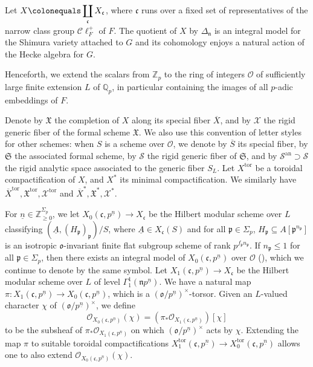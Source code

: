 \documentclass[11pt]{amsart}
\theoremstyle{definition} %
\theoremstyle{plain} %
\theoremstyle{remark} %
\newcommand{\QQ}{{\mathbb Q}}
\newcommand{\ZZ}{{\mathbb Z}}
\newcommand{\cO}{{\mathcal O}}
\newcommand{\cS}{{\mathcal S}}
\newcommand{\cX}{{\mathcal X}}
\newcommand{\frakS}{\mathfrak S}
\newcommand{\frakX}{\mathfrak X}
\newcommand{\frakc}{\mathfrak c}
\newcommand{\frakn}{\mathfrak n}
\newcommand{\frako}{\mathfrak o}
\newcommand{\frakp}{\mathfrak p}
\newcommand{\defeq}{\colonequals} %
\newcommand{\tor}{\mathrm{tor}} %
\newcommand{\an}{\mathrm{an}}
\newcommand{\Cl}{\mathscr{C}\!\ell_F^+}
\begin{document}
Let $\displaystyle   X\defeq\coprod_{\frakc} X_{\frakc}$,
where $\frakc$ runs over a fixed set of representatives of the narrow class group $\Cl$ of $F$. The quotient of $X$ by $\Delta_\frakn$ is an integral model for the Shimura variety attached to $G$ and its cohomology enjoys a natural action of the  Hecke algebra for $G$. 

Henceforth,  we extend the scalars from $\ZZ_p$ to the ring of integers $\cO$ of sufficiently large finite extension $L$ of $\QQ_p$, in particular containing the images of all $p$-adic embeddings of $F$. 

Denote by  $\frakX$  the completion of $X$ along its special fiber  $\overline{X}$, and by $\cX$ the rigid generic fiber of the formal scheme $\frakX$.
We also use this convention of letter styles for other schemes: when $S$ is a scheme over $\cO$, we denote by $\overline{S}$ its special fiber, by $\frakS$ the associated formal scheme, by $\cS$ the rigid generic fiber of $\frakS$, and by $\cS^\an\supset \cS$ the rigid analytic space associated to the generic fiber $S_L$.
Let $X^\tor$ be a toroidal compactification of $X$, and $X^\ast$ its minimal compactification.
We similarly have $\overline{X}^\tor, \frakX^\tor, \cX^\tor$ and $\overline{X}^\ast, \frakX^\ast, \cX^\ast$.

For $\underline{n}  \in \ZZ_{\geqslant 0}^{\Sigma_p}$, we  let $X_0(\frakc,p^{\underline{n}}) \rightarrow X_{\frakc}$ be the Hilbert modular scheme over $L$ classifying $(\underline{A}, (H_{\frakp})_{\frakp})/S$, where $\underline{A}\in X_\frakc(S)$ and for all $\frakp\in \Sigma_p$, $H_{\frakp}\subseteq A[\frakp^{n_\frakp}]$ is an isotropic $\frako$-invariant finite flat subgroup scheme of rank $p^{f_\frakp  n_\frakp}$.
If $n_\frakp \leqslant 1$ for all $\frakp\in \Sigma_p$, then there exists an integral model of $X_0(\frakc,p^{\underline{n}})$ over $\cO$ (\cite[\S3]{Diamond}), which we continue to denote by the same symbol.
Let $X_1(\frakc,p^{\underline{n}})\rightarrow X_{\frakc}$  be the Hilbert modular scheme over $L$ of level $\Gamma_1^1(\frakn p^{\underline{n}})$. 
We have a natural map $\pi\colon X_1(\frakc,p^{\underline{n}}) \rightarrow X_0(\frakc,p^{\underline{n}})$, which is a $(\frako/p^{\underline{n}})^\times$-torsor.
Given an $L$-valued character $\chi$ of $(\frako/p^{\underline{n}})^\times$, we define 
\begin{equation}\label{eq:twist}
\cO_{X_0(\frakc,p^{\underline{n}})}(\chi) = \left(\pi_\ast \cO_{X_1(\frakc,p^{\underline{n}})}\right)[\chi]
\end{equation}
to be the subsheaf of $\pi_\ast \cO_{X_1(\frakc,p^{\underline{n}})}$ on which $(\frako/p^{\underline{n}})^\times$ acts by $\chi$.
Extending the map $\pi$ to  suitable toroidal compactifications $X_1^\tor(\frakc,p^{\underline{n}})\to X_0^\tor(\frakc,p^{\underline{n}})$  allows one to also extend  $\cO_{X_0(\frakc,p^{\underline{n}})}(\chi)$.
\end{document}
